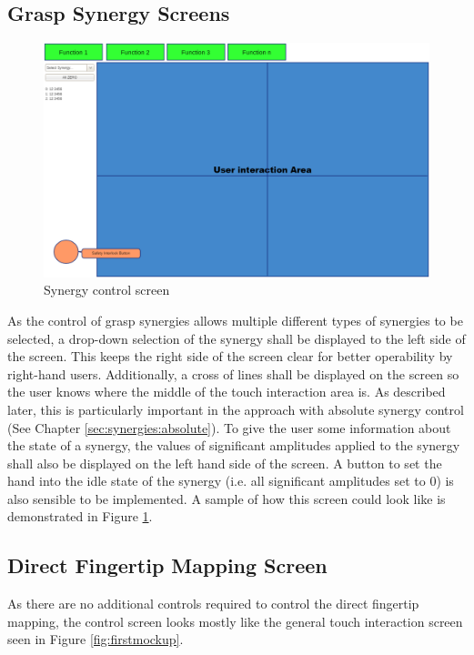 \subsection{Grasp Synergy Screens}

\begin{figure}
	\caption{\label{fig:screen:synergy}Synergy control screen}
	\includegraphics[width=\linewidth]{assets/chpt_concepts/grasp_synergy_page}
\end{figure}

As the control of grasp synergies allows multiple different types of synergies to be selected, a drop-down selection of the synergy shall be displayed to the left side of the screen. This keeps the right side of the screen clear for better operability by right-hand users. Additionally, a cross of lines shall be displayed on the screen so the user knows where the middle of the touch interaction area is. As described later, this is particularly important in the approach with absolute synergy control (See Chapter \ref{sec:synergies:absolute}). To give the user some information about the state of a synergy, the values of significant amplitudes applied to the synergy shall also be displayed on the left hand side of the screen. A button to set the hand into the idle state of the synergy (i.e. all significant amplitudes set to $0$) is also sensible to be implemented. A sample of how this screen could look like is demonstrated in Figure \ref{fig:screen:synergy}.

\subsection{Direct Fingertip Mapping Screen}

As there are no additional controls required to control the direct fingertip mapping, the control screen looks mostly like the general touch interaction screen seen in Figure \ref{fig:firstmockup}.


